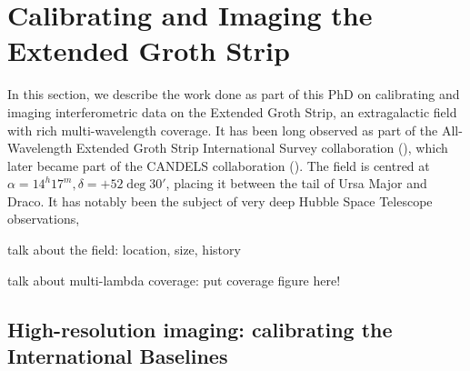 
\section{Calibrating and Imaging the Extended Groth Strip}\label{section.calibration}
\pg
In this section, we describe the work done as part of this PhD on calibrating and imaging interferometric data on the Extended Groth Strip, an extragalactic field with rich multi-wavelength coverage. It has been long observed as part of the All-Wavelength Extended Groth Strip International Survey collaboration (), which later became part of the CANDELS collaboration (). The field is centred at $\alpha=14^h17^m,\delta=+52\deg 30'$, placing it between the tail of Ursa Major and Draco. It has notably been the subject of very deep Hubble Space Telescope observations, 



talk about the field: location, size, history

talk about multi-lambda coverage: put coverage figure here!

\subsection{High-resolution imaging: calibrating the International Baselines}